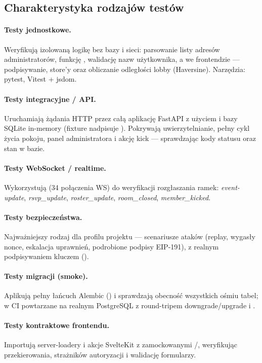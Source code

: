 \subsection{Charakterystyka rodzajów testów}

\paragraph{Testy jednostkowe.} Weryfikują izolowaną logikę bez bazy i sieci: parsowanie
listy adresów administratorów, funkcję , walidację nazw użytkownika,
a we frontendzie — podpisywanie, store'y oraz obliczanie odległości lobby (Haversine).
Narzędzia: pytest, Vitest + jsdom.

\paragraph{Testy integracyjne / API.} Uruchamiają żądania HTTP przez całą aplikację
FastAPI z użyciem  i bazy SQLite in-memory (fixture nadpisuje
). Pokrywają uwierzytelnianie, pełny cykl życia pokoju, panel
administratora i akcję kick — sprawdzając kody statusu oraz stan w bazie.

\paragraph{Testy WebSocket / realtime.} Wykorzystują 
(34 połączenia WS) do weryfikacji rozgłaszania ramek: \emph{event-update},
\emph{rsvp\_update}, \emph{roster\_update}, \emph{room\_closed}, \emph{member\_kicked}.

\paragraph{Testy bezpieczeństwa.} Najważniejszy rodzaj dla profilu projektu —
scenariusze ataków (replay, wygasły nonce, eskalacja uprawnień, podrobione podpisy
EIP-191), z realnym podpisywaniem kluczem ().

\paragraph{Testy migracji (smoke).} Aplikują pełny łańcuch Alembic
() i sprawdzają obecność wszystkich ośmiu tabel; w CI
powtarzane na realnym PostgreSQL z round-tripem downgrade/upgrade i .

\paragraph{Testy kontraktowe frontendu.} Importują server-loadery i akcje SvelteKit
z zamockowanymi /, weryfikując przekierowania, strażników
autoryzacji i walidację formularzy.

